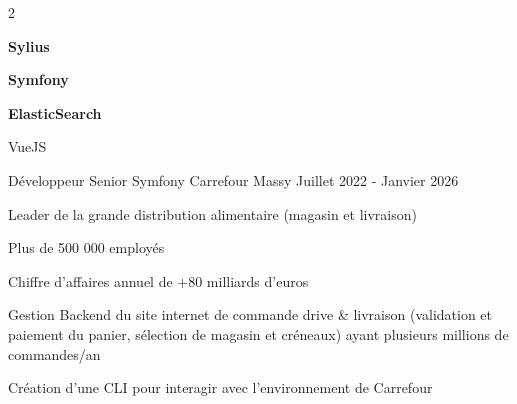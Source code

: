 \begin{cventries}
\begin{cvexperience}
		\vspace{-5mm}
		\begin{multicols}{2}
			\begin{cvitems}
				\item \textbf{Sylius}
				\item \textbf{Symfony}
				\item \textbf{ElasticSearch}
				\item VueJS
			\end{cvitems}
		\end{multicols}
	\end{cvexperience}

	\begin{cvexperience}
		\cvbigentry
		{Développeur Senior Symfony} %
		{ Carrefour} %
		{Massy} %
		{Juillet 2022 - Janvier 2026} %
		{
			\vspace{2mm}
			\begin{cvitems} %
				\item{Leader de la grande distribution alimentaire (magasin et livraison)}
				\item{Plus de 500 000 employés}
				\item {Chiffre d'affaires annuel de +80 milliards d'euros}
				\item {Gestion Backend du site internet de commande drive \& livraison (validation et paiement du panier, sélection de magasin et créneaux) ayant plusieurs millions de commandes/an}
				\item {Création d'une CLI pour interagir avec l'environnement de Carrefour}
			\end{cvitems}
		}


\end{cvexperience}
\end{cventries}
